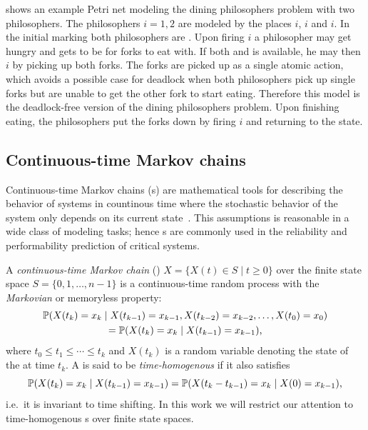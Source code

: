 \begin{runningExample}\label{ex:background:pn}
   shows an example Petri net modeling the dining philosophers problem with two philosophers. The philosophers \(i = 1, 2\) are modeled by the places \(i\), \(i\) and \(i\). In the initial marking both philosophers are . Upon firing \(i\) a philosopher may get hungry and gets to be  for forks to eat with. If both  and  is available, he may then \(i\) by picking up both forks. The forks are picked up as a single atomic action, which avoids a possible case for deadlock when both philosophers pick up single forks but are unable to get the other fork to start eating. Therefore this model is the deadlock-free version of the dining philosophers problem. Upon finishing eating, the philosophers put the forks down by firing \(i\) and returning to the  state.
\end{runningExample}

\subsection{Continuous-time Markov chains}

Continuous-time Markov chains (s) are mathematical tools for describing the behavior of systems in countinous time where the stochastic behavior of the system only depends on its current state~. This assumptions is reasonable in a wide class of modeling tasks; hence s are commonly used in the reliability and performability prediction of critical systems.

\begin{dfn}
  A \emph{continuous-time Markov chain} ()
  \(X = \{ X(t) \in S \mid t \ge 0 \}\) over the finite state
  space $S = \{0, 1, \ldots, n - 1\}$ is a continuous-time random
  process with the \emph{Markovian} or memoryless property:
  \begin{multline}\allowdisplaybreaks[0]
    \Pr(X(t_k) = x_k \mid X(t_{k - 1}) = x_{k - 1}, X(t_{k -
      2}) = x_{k - 2}, \ldots, X(t_{0}) = x_{0}) \\
    = \Pr(X(t_k) = x_k \mid X(t_{k - 1}) = x_{k - 1}) \text,
  \end{multline}
  where $t_0 \le t_1 \le \cdots \le t_k$ and $X(t_k)$ is a random variable denoting the state of the  at time $t_k$. A  is said to be
  \emph{time-homogenous} if it also satisfies
  \begin{equation}
    \Pr(X(t_k) = x_k \mid X(t_{k - 1}) = x_{k - 1}) = \Pr(X(t_k - t_{k -
      1}) = x_k \mid X(0) = x_{k - 1}) \text,
  \end{equation}
  i.e.~it is invariant to time shifting. In this work we will restrict our attention to time-homogenous s over finite state spaces.
\end{dfn}

